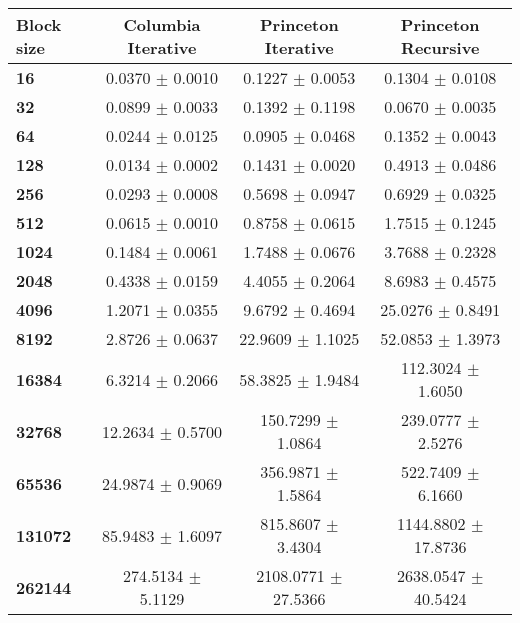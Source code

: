 \begin{tabular}{lccc}\toprule
\textbf{Block size}  & \textbf{Columbia Iterative} & \textbf{Princeton Iterative} & \textbf{Princeton Recursive}\\\midrule
\textbf{16}  & 0.0370 $\pm$ 0.0010 & 0.1227 $\pm$ 0.0053 & 0.1304 $\pm$ 0.0108\\
\textbf{32}  & 0.0899 $\pm$ 0.0033 & 0.1392 $\pm$ 0.1198 & 0.0670 $\pm$ 0.0035\\
\textbf{64}  & 0.0244 $\pm$ 0.0125 & 0.0905 $\pm$ 0.0468 & 0.1352 $\pm$ 0.0043\\
\textbf{128}  & 0.0134 $\pm$ 0.0002 & 0.1431 $\pm$ 0.0020 & 0.4913 $\pm$ 0.0486\\
\textbf{256}  & 0.0293 $\pm$ 0.0008 & 0.5698 $\pm$ 0.0947 & 0.6929 $\pm$ 0.0325\\
\textbf{512}  & 0.0615 $\pm$ 0.0010 & 0.8758 $\pm$ 0.0615 & 1.7515 $\pm$ 0.1245\\
\textbf{1024}  & 0.1484 $\pm$ 0.0061 & 1.7488 $\pm$ 0.0676 & 3.7688 $\pm$ 0.2328\\
\textbf{2048}  & 0.4338 $\pm$ 0.0159 & 4.4055 $\pm$ 0.2064 & 8.6983 $\pm$ 0.4575\\
\textbf{4096}  & 1.2071 $\pm$ 0.0355 & 9.6792 $\pm$ 0.4694 & 25.0276 $\pm$ 0.8491\\
\textbf{8192}  & 2.8726 $\pm$ 0.0637 & 22.9609 $\pm$ 1.1025 & 52.0853 $\pm$ 1.3973\\
\textbf{16384}  & 6.3214 $\pm$ 0.2066 & 58.3825 $\pm$ 1.9484 & 112.3024 $\pm$ 1.6050\\
\textbf{32768}  & 12.2634 $\pm$ 0.5700 & 150.7299 $\pm$ 1.0864 & 239.0777 $\pm$ 2.5276\\
\textbf{65536}  & 24.9874 $\pm$ 0.9069 & 356.9871 $\pm$ 1.5864 & 522.7409 $\pm$ 6.1660\\
\textbf{131072}  & 85.9483 $\pm$ 1.6097 & 815.8607 $\pm$ 3.4304 & 1144.8802 $\pm$ 17.8736\\
\textbf{262144} & 274.5134 $\pm$ 5.1129 & 2108.0771 $\pm$ 27.5366 & 2638.0547 $\pm$ 40.5424\\
\bottomrule
\end{tabular}
